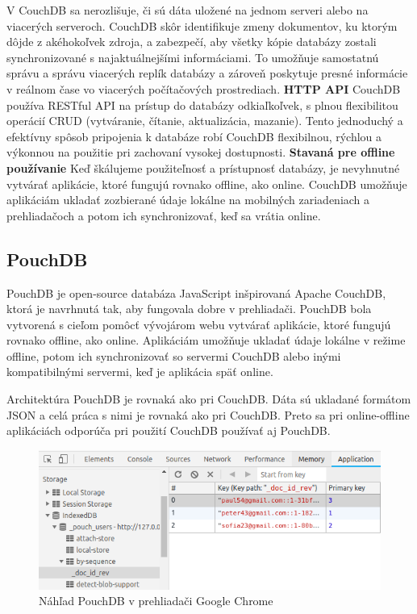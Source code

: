 \indent V CouchDB sa nerozlišuje, či sú dáta uložené na jednom serveri alebo na viacerých serveroch. CouchDB skôr identifikuje zmeny dokumentov, ku ktorým dôjde z akéhokoľvek zdroja, a zabezpečí, aby všetky kópie databázy zostali synchronizované s najaktuálnejšími informáciami. To umožňuje samostatnú správu a správu viacerých replík databázy a zároveň poskytuje presné informácie v reálnom čase vo viacerých počítačových prostrediach\cite{coucdb}.\newpage
\noindent\textbf{HTTP API} \newline
\indent CouchDB používa RESTful API na prístup do databázy odkiaľkoľvek, s plnou flexibilitou operácií CRUD (vytváranie, čítanie, aktualizácia, mazanie). Tento jednoduchý a efektívny spôsob pripojenia k databáze robí CouchDB flexibilnou, rýchlou a výkonnou na použitie pri zachovaní vysokej dostupnosti\cite{coucdb}.\newline
\textbf{Stavaná pre offline používanie} \newline
\indent Keď škálujeme použiteľnosť a prístupnosť databázy, je nevyhnutné vytvárať aplikácie, ktoré fungujú rovnako offline, ako online. CouchDB umožňuje aplikáciám ukladať zozbierané údaje lokálne na mobilných zariadeniach a prehliadačoch a potom ich synchronizovať, keď sa vrátia online\cite{coucdb}.

\subsection{PouchDB}
\indent PouchDB je open-source databáza JavaScript inšpirovaná Apache CouchDB, ktorá je navrhnutá tak, aby fungovala dobre v prehliadači. PouchDB bola vytvorená s cieľom pomôcť vývojárom webu vytvárať aplikácie, ktoré fungujú rovnako offline, ako online. Aplikáciám umožňuje ukladať údaje lokálne v režime offline, potom ich synchronizovať so servermi CouchDB alebo inými kompatibilnými servermi, keď je aplikácia späť online.

\indent Architektúra PouchDB je rovnaká ako pri CouchDB. Dáta sú ukladané formátom JSON a celá práca s nimi je rovnaká ako pri CouchDB. Preto sa pri online-offline aplikáciách odporúča pri použití CouchDB používať aj PouchDB\cite{poucdb}.

\begin{figure}[H]
    \centering
    \includegraphics[scale=0.80]{img/pouchdb.png}
    \caption{Náhľad PouchDB v prehliadači Google Chrome\cite{poucdb}}
    \label{fig:pouch_db}
\end{figure}

